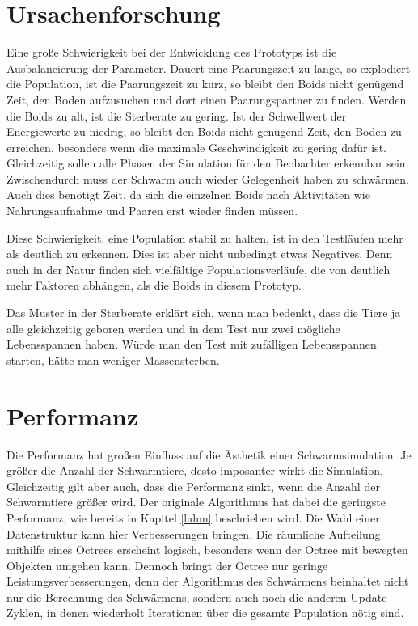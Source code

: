 \documentclass[draft=false
              ,paper=a4
              ,twoside=false
              ,fontsize=11pt
              ,headsepline
              ,BCOR10mm
              ,DIV11
              ,bibtotoc
              ,liststotoc
              ]{scrbook}
\begin{document}
\section{Ursachenforschung}
Eine große Schwierigkeit bei der Entwicklung des Prototyps ist die Ausbalancierung der Parameter. Dauert eine Paarungszeit zu lange, so explodiert die Population, ist die Paarungszeit zu kurz, so bleibt den Boids nicht genügend Zeit, den Boden aufzusuchen und dort einen Paarungspartner zu finden. Werden die Boids zu alt, ist die Sterberate zu gering. Ist der Schwellwert der Energiewerte zu niedrig, so bleibt den Boids nicht genügend Zeit, den Boden zu erreichen, besonders wenn die maximale Geschwindigkeit zu gering dafür ist. Gleichzeitig sollen alle Phasen der Simulation für den Beobachter erkennbar sein. Zwischendurch muss der Schwarm auch wieder Gelegenheit haben zu schwärmen. Auch dies benötigt Zeit, da sich die einzelnen Boids nach Aktivitäten wie Nahrungsaufnahme und Paaren erst wieder finden müssen.

Diese Schwierigkeit, eine Population stabil zu halten, ist in den Testläufen mehr als deutlich zu erkennen. Dies ist aber nicht unbedingt etwas Negatives. Denn auch in der Natur finden sich vielfältige Populationsverläufe, die von deutlich mehr Faktoren abhängen, als die Boids in diesem Prototyp.

Das Muster in der Sterberate erklärt sich, wenn man bedenkt, dass die Tiere ja alle gleichzeitig geboren werden und in dem Test nur zwei mögliche Lebensspannen haben. Würde man den Test mit zufälligen Lebensspannen starten, hätte man weniger Massensterben.

\section{Performanz}
Die Performanz hat großen Einfluss auf die Ästhetik einer Schwarmsimulation. Je größer die Anzahl der Schwarmtiere, desto imposanter wirkt die Simulation. Gleichzeitig gilt aber auch, dass die Performanz sinkt, wenn die Anzahl der Schwarmtiere größer wird. Der originale Algorithmus hat dabei die geringste Performanz, wie bereits in Kapitel \ref{lahm} beschrieben wird. Die Wahl einer Datenstruktur kann hier Verbesserungen bringen. Die räumliche Aufteilung mithilfe eines Octrees erscheint logisch, besonders wenn der Octree mit bewegten Objekten umgehen kann. Dennoch bringt der Octree nur geringe Leistungsverbesserungen, denn der Algorithmus des Schwärmens beinhaltet nicht nur die Berechnung des Schwärmens, sondern auch noch die anderen Update-Zyklen, in denen wiederholt Iterationen über die gesamte Population nötig sind.
\end{document}
